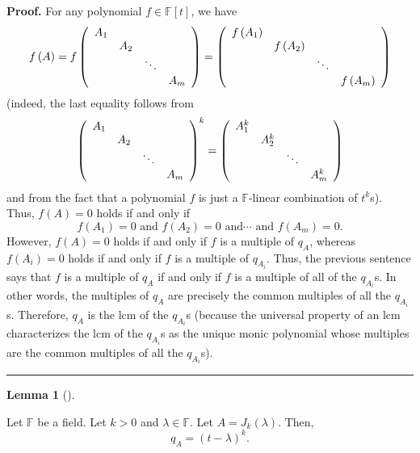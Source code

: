 \documentclass[numbers=enddot,12pt,final,onecolumn,notitlepage]{scrartcl}%
\numberwithin{exer}{subsection}
\theoremstyle{definition}
\newtheorem{lem}[theo]{Lemma}
\newenvironment{lemma}[1][]
{\begin{lem}[#1]\begin{leftbar}}
{\end{leftbar}\end{lem}}
\newenvironment{proof}[1][Proof]{\noindent\textbf{#1.} }{\ \rule{0.5em}{0.5em}}
\begin{document}
\begin{proof}
For any polynomial $f\in\mathbb{F}\left[  t\right]  $, we have%
\[
f\left(  A\right)  =f\left(
\begin{array}
[c]{cccc}%
A_{1} &  &  & \\
& A_{2} &  & \\
&  & \ddots & \\
&  &  & A_{m}%
\end{array}
\right)  =\left(
\begin{array}
[c]{cccc}%
f\left(  A_{1}\right)  &  &  & \\
& f\left(  A_{2}\right)  &  & \\
&  & \ddots & \\
&  &  & f\left(  A_{m}\right)
\end{array}
\right)
\]
(indeed, the last equality follows from%
\[
\left(
\begin{array}
[c]{cccc}%
A_{1} &  &  & \\
& A_{2} &  & \\
&  & \ddots & \\
&  &  & A_{m}%
\end{array}
\right)  ^{k}=\left(
\begin{array}
[c]{cccc}%
A_{1}^{k} &  &  & \\
& A_{2}^{k} &  & \\
&  & \ddots & \\
&  &  & A_{m}^{k}%
\end{array}
\right)
\]
and from the fact that a polynomial $f$ is just a $\mathbb{F}$-linear
combination of $t^{k}$s). Thus, $f\left(  A\right)  =0$ holds if and only if%
\[
f\left(  A_{1}\right)  =0\text{ and }f\left(  A_{2}\right)  =0\text{ and
}\cdots\text{ and }f\left(  A_{m}\right)  =0.
\]
However, $f\left(  A\right)  =0$ holds if and only if $f$ is a multiple of
$q_{A}$, whereas $f\left(  A_{i}\right)  =0$ holds if and only if $f$ is a
multiple of $q_{A_{i}}$. Thus, the previous sentence says that $f$ is a
multiple of $q_{A}$ if and only if $f$ is a multiple of all of the $q_{A_{i}}%
$s. In other words, the multiples of $q_{A}$ are precisely the common
multiples of all the $q_{A_{i}}$s. Therefore, $q_{A}$ is the lcm of the
$q_{A_{i}}$s (because the universal property of an lcm characterizes the lcm
of the $q_{A_{i}}$s as the unique monic polynomial whose multiples are the
common multiples of all the $q_{A_{i}}$s).
\end{proof}

\begin{lemma}
\label{lem.jnf.mipo.Jklam}Let $\mathbb{F}$ be a field. Let $k>0$ and
$\lambda\in\mathbb{F}$. Let $A=J_{k}\left(  \lambda\right)  $. Then,%
\[
q_{A}=\left(  t-\lambda\right)  ^{k}.
\]

\end{lemma}
\end{document}
